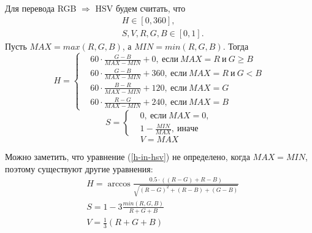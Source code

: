 Для перевода RGB $\Rightarrow$ HSV будем считать, что
$$
\begin{aligned}
	&H \in [0, 360], \\
	&S, V, R, G, B \in [0, 1].
\end{aligned}
$$
Пусть $MAX=max(R, G, B)$, а $MIN=min(R, G, B)$.
Тогда
\begin{equation}
	H=\left\{\begin{aligned}
	&60 \cdot \frac{G-B}{MAX-MIN}+0,~ если~MAX=R~и~G \geq B \\
	&60 \cdot \frac{G-B}{MAX-MIN}+360,~ если~MAX=R~и~G < B \\
	&60 \cdot \frac{B-R}{MAX-MIN}+120,~ если~MAX=G \\
	&60 \cdot \frac{R-G}{MAX-MIN}+240,~ если~MAX=B
\end{aligned}\right. 
\label{h-in-hsv}
\end{equation}
\begin{equation}
	S=\left\{\begin{aligned}
	&0,~если~MAX=0, \\
	&1-\frac{MIN}{MAX},~иначе
\end{aligned}\right.
\label{s-in-hsv}
\end{equation}
\begin{equation}
	V=MAX
	\label{v-in-hsv}
\end{equation}

Можно заметить, что уравнение (\ref{h-in-hsv}) не определено, когда $MAX=MIN$, поэтому существуют другие
уравнения:
\begin{equation}
	\begin{aligned}
	&H=\arccos\frac{0.5\cdot((R-G)+R-B)}{\sqrt{(R-G)^2 + (R-B) + (G-B)}} \\
	&S=1-3\frac{min(R,G,B)}{R+G+B} \\
	&V=\frac{1}{3}(R+G+B)
\end{aligned}
\label{hsv-equations}
\end{equation}

